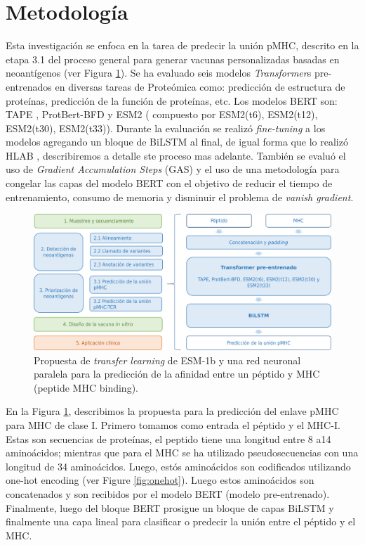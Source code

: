 \section{Metodología}

Esta investigación se  enfoca en la tarea de predecir la unión pMHC, descrito en la etapa 3.1 del proceso general para generar vacunas personalizadas basadas en neoantígenos (ver Figura \ref{fig:proposal}). Se ha evaluado  seis modelos \textit{Transformer}s pre-entrenados en diversas tareas de Proteómica como: predicción de estructura de proteínas, predicción de la función de proteínas, etc. Los modelos BERT son: TAPE \citep{rao2019evaluating}, ProtBert-BFD \citep{elnaggar2021prottrans} y ESM2 \citep{lin2023evolutionary} ( compuesto por ESM2(t6), ESM2(t12), ESM2(t30), ESM2(t33)). Durante la evaluación se realizó \textit{fine-tuning} a los modelos agregando un bloque de BiLSTM al final, de igual forma que lo realizó HLAB \citep{zhang2022hlab}, describiremos a detalle ste proceso mas adelante. También se evaluó el uso de \textit{Gradient Accumulation Steps} (GAS) y el uso de una metodología para congelar las capas del modelo BERT con el objetivo de reducir el tiempo de entrenamiento, consumo de memoria y disminuir el problema de \textit{vanish gradient}. 






\begin{figure}[H]
	\centering
	\includegraphics[width=\textwidth]{../img/proposal/proposal}	
	\caption{Propuesta de \textit{transfer learning} de ESM-1b y una red neuronal paralela para la predicción de la afinidad entre un péptido y MHC (peptide MHC binding).}
	\label{fig:proposal}
\end{figure}

En la Figura \ref{fig:proposal}, describimos la propuesta para la predicción del enlave pMHC para MHC de clase I. Primero tomamos como entrada el péptido y el MHC-I. Estas son secuencias de proteínas, el peptido tiene una longitud entre 8 a14 aminoácidos; mientras que para el MHC se ha utilizado pseudosecuencias con una longitud de 34 aminoácidos. Luego, estós aminoácidos son codificados utilizando one-hot encoding (ver Figure \ref{fig:onehot}). Luego estos aminoácidos son concatenados y son recibidos por el modelo BERT (modelo pre-entrenado). Finalmente, luego del bloque BERT prosigue un bloque de capas BiLSTM y finalmente una capa lineal para clasificar o predecir la unión entre el péptido y el MHC.

